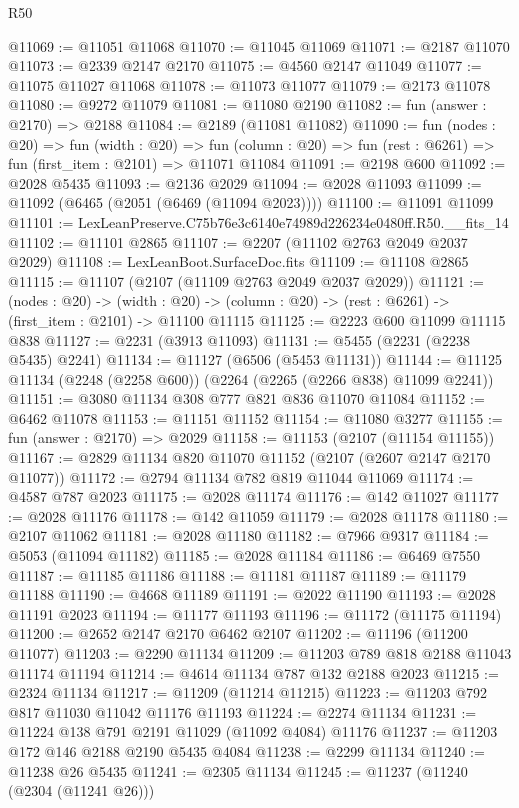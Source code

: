 \begin{lexlean}{R50}
\begin{coremodule}
@11069 := @11051 @11068
@11070 := @11045 @11069
@11071 := @2187 @11070
@11073 := @2339 @2147 @2170
@11075 := @4560 @2147 @11049
@11077 := @11075 @11027 @11068
@11078 := @11073 @11077
@11079 := @2173 @11078
@11080 := @9272 @11079
@11081 := @11080 @2190
@11082 := fun (answer : @2170) => @2188
@11084 := @2189 (@11081 @11082)
@11090 := fun (nodes : @20) =>
  fun (width : @20) =>
  fun (column : @20) => fun (rest : @6261) => fun (first_item : @2101) => @11071 @11084
@11091 := @2198 @600
@11092 := @2028 @5435
@11093 := @2136 @2029
@11094 := @2028 @11093
@11099 := @11092 (@6465 (@2051 (@6469 (@11094 @2023))))
@11100 := @11091 @11099
@11101 := LexLeanPreserve.C75b76e3c6140e74989d226234e0480ff.R50.__fits_14
@11102 := @11101 @2865
@11107 := @2207 (@11102 @2763 @2049 @2037 @2029)
@11108 := LexLeanBoot.SurfaceDoc.fits
@11109 := @11108 @2865
@11115 := @11107 (@2107 (@11109 @2763 @2049 @2037 @2029))
@11121 := (nodes : @20) ->
  (width : @20) -> (column : @20) -> (rest : @6261) -> (first_item : @2101) -> @11100 @11115
@11125 := @2223 @600 @11099 @11115 @838
@11127 := @2231 (@3913 @11093)
@11131 := @5455 (@2231 (@2238 @5435) @2241)
@11134 := @11127 (@6506 (@5453 @11131))
@11144 := @11125 @11134 (@2248 (@2258 @600)) (@2264 (@2265 (@2266 @838) @11099 @2241))
@11151 := @3080 @11134 @308 @777 @821 @836 @11070 @11084
@11152 := @6462 @11078
@11153 := @11151 @11152
@11154 := @11080 @3277
@11155 := fun (answer : @2170) => @2029
@11158 := @11153 (@2107 (@11154 @11155))
@11167 := @2829 @11134 @820 @11070 @11152 (@2107 (@2607 @2147 @2170 @11077))
@11172 := @2794 @11134 @782 @819 @11044 @11069
@11174 := @4587 @787 @2023
@11175 := @2028 @11174
@11176 := @142 @11027
@11177 := @2028 @11176
@11178 := @142 @11059
@11179 := @2028 @11178
@11180 := @2107 @11062
@11181 := @2028 @11180
@11182 := @7966 @9317
@11184 := @5053 (@11094 @11182)
@11185 := @2028 @11184
@11186 := @6469 @7550
@11187 := @11185 @11186
@11188 := @11181 @11187
@11189 := @11179 @11188
@11190 := @4668 @11189
@11191 := @2022 @11190
@11193 := @2028 @11191 @2023
@11194 := @11177 @11193
@11196 := @11172 (@11175 @11194)
@11200 := @2652 @2147 @2170 @6462 @2107
@11202 := @11196 (@11200 @11077)
@11203 := @2290 @11134
@11209 := @11203 @789 @818 @2188 @11043 @11174 @11194
@11214 := @4614 @11134 @787 @132 @2188 @2023
@11215 := @2324 @11134
@11217 := @11209 (@11214 @11215)
@11223 := @11203 @792 @817 @11030 @11042 @11176 @11193
@11224 := @2274 @11134
@11231 := @11224 @138 @791 @2191 @11029 (@11092 @4084) @11176
@11237 := @11203 @172 @146 @2188 @2190 @5435 @4084
@11238 := @2299 @11134
@11240 := @11238 @26 @5435
@11241 := @2305 @11134
@11245 := @11237 (@11240 (@2304 (@11241 @26)))

\end{coremodule}
\end{lexlean}
